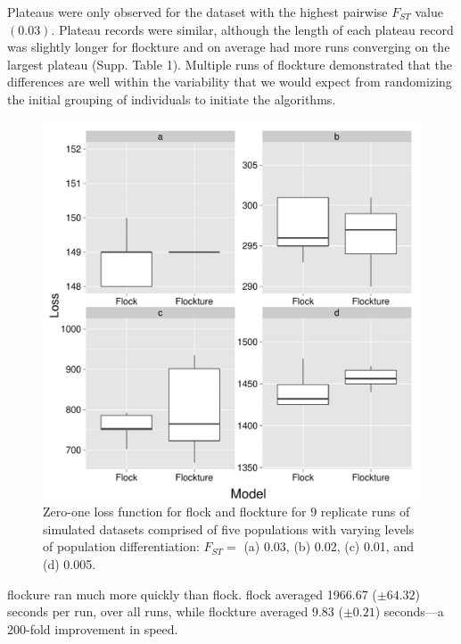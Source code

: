 Plateaus were only observed for the dataset 
with the highest pairwise $F_{ST}$ value $(0.03)$. Plateau records were similar, although 
the length of each plateau record was slightly longer for {\sc flockture} and on average had more runs converging on
the largest plateau (Supp. Table 1). Multiple runs of {\sc flockture} demonstrated that the differences are well within the
variability that we would expect from randomizing the initial grouping of individuals to 
initiate the algorithms.

\begin{figure}
\begin{center}
  \includegraphics[width=.9\linewidth]{images/Figures-Pat/FlockvFlocktureLoss.pdf}
  \caption{Zero-one loss function for {\sc flock} and {\sc flockture} for 9 replicate 
  runs of simulated datasets comprised of five populations with varying
  levels of population differentiation:  $F_{ST} = $ (a) 0.03, (b) 0.02, (c) 0.01, and (d) 0.005.}
  \label{fig:FvFloss}
\end{center}
\end{figure}

{\sc flockure} ran much more quickly than {\sc flock}.  {\sc flock} 
averaged 1966.67 ($\pm 64.32$) seconds per run,
over all runs, while {\sc flockture} averaged 9.83 ($\pm 0.21$) seconds---a 200-fold improvement in 
speed. 

